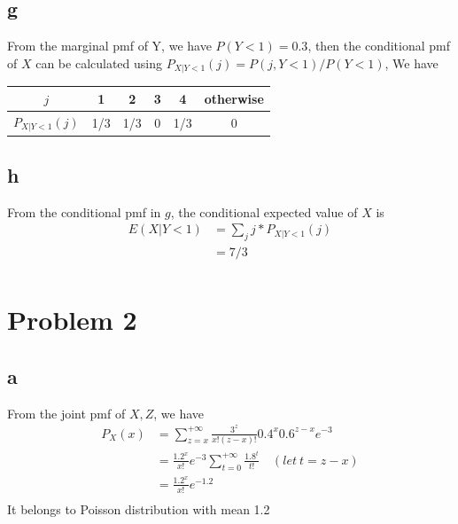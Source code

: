\documentclass[12pt,letterpaper]{article}
\begin{document}
    \subsection*{g}
        From the marginal pmf of Y, we have $P(Y < 1) = 0.3$, then the conditional pmf of $X$ can be calculated using $P_{X | Y < 1}(j) = P(j, Y < 1) / P(Y < 1)$, We have
        \begin{center}
            \begin{tabular}{| c | c | c | c | c | c |}
                \hline
                $j$  & 1 & 2 & 3 & 4 & otherwise\\
                \hline
                $P_{X | Y < 1}(j)$ & 1/3 & 1/3 & 0 & 1/3 & 0 \\
                \hline
            \end{tabular}
        \end{center}
    \subsection*{h}
        From the conditional pmf in $g$, the conditional expected value of $X$ is
        \begin{equation*}
            \begin{aligned}
                E(X | Y < 1) &= \sum_{j} j * P_{X | Y < 1}(j) \\
                &= 7/3 \\
            \end{aligned}
        \end{equation*}

\section*{Problem 2}
    \subsection*{a}
        From the joint pmf of $X, Z$, we have
        \begin{equation*}
            \begin{aligned}
                P_{X}(x) &= \sum_{z = x}^{+\infty} \frac{3^{z}}{x!(z - x)!} 0.4^{x} 0.6^{z - x} e^{-3} \\
                &= \frac{1.2^{x}}{x!} e^{-3} \sum_{t = 0}^{+\infty}  \frac{1.8^{t}}{t!}\quad (let\ t = z - x) \\
                &= \frac{1.2^{x}}{x!}e^{-1.2} \\
            \end{aligned}
        \end{equation*}
        It belongs to Poisson distribution with mean 1.2
\end{document}
